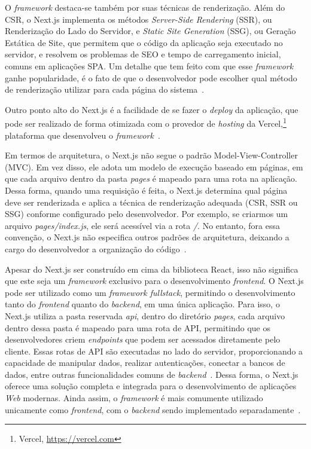 O \textit{framework} destaca-se também por suas técnicas de renderização.
Além do CSR, o Next.js implementa os métodos \textit{Server-Side Rendering} (SSR), ou Renderização do Lado do Servidor,
e \textit{Static Site Generation} (SSG), ou Geração Estática de Site, que permitem que o código da aplicação seja executado
no servidor, e resolvem os problemas de SEO e tempo de carregamento inicial, comuns em 
aplicações SPA. Um detalhe que tem feito com que esse \textit{framework}
ganhe popularidade, é o fato de que o desenvolvedor pode escolher qual método de renderização
utilizar para cada página do sistema~\cite{vercel:2023}.

Outro ponto alto do Next.js é a facilidade de se fazer o \textit{deploy} da aplicação, que pode ser realizado
de forma otimizada com o provedor de \textit{hosting} da Vercel,\footnote{Vercel, \url{https://vercel.com}} 
plataforma que desenvolveu o \textit{framework}~\cite{nextjs:2023}.

Em termos de arquitetura, o Next.js não segue o padrão Model-View-Controller (MVC). Em vez
disso, ele adota um modelo de execução baseado em páginas, em que cada arquivo dentro
da pasta \textit{pages} é mapeado para uma rota na aplicação. Dessa forma, quando uma requisição
é feita, o Next.js determina qual página deve ser renderizada e aplica a técnica de
renderização adequada (CSR, SSR ou SSG) conforme configurado pelo desenvolvedor.
Por exemplo, se criarmos um arquivo \textit{pages/index.js}, ele será acessível via a rota
\textit{/}. No entanto, fora essa convenção, o Next.js não especifica outros padrões de arquitetura,
deixando a cargo do desenvolvedor a organização do código~\cite{nextjs:2023}.

Apesar do Next.js ser construído em cima da biblioteca React, isso não significa que este seja
um \textit{framework} exclusivo para o desenvolvimento \textit{frontend}. O Next.js pode ser utilizado
como um \textit{framework fullstack}, permitindo o desenvolvimento tanto do \textit{frontend} quanto
do \textit{backend}, em uma única aplicação. Para isso, o Next.js utiliza a pasta reservada
\textit{api}, dentro do diretório \textit{pages}, cada arquivo dentro dessa pasta é mapeado
para uma rota de API, permitindo que os desenvolvedores criem \textit{endpoints} que podem ser
acessados diretamente pelo cliente. Essas rotas de API são executadas no lado do
servidor, proporcionando a capacidade de manipular dados, realizar autenticações,
conectar a bancos de dados, entre outras funcionalidades comuns de \textit{backend}~\cite{nextjs:2023}.
Dessa forma, o Next.js oferece uma solução completa e integrada para o desenvolvimento
de aplicações \textit{Web} modernas. Ainda assim, o \textit{framework} é mais comumente utilizado
unicamente como \textit{frontend}, com o \textit{backend} sendo implementado separadamente~\cite{atlassian:2024}.



